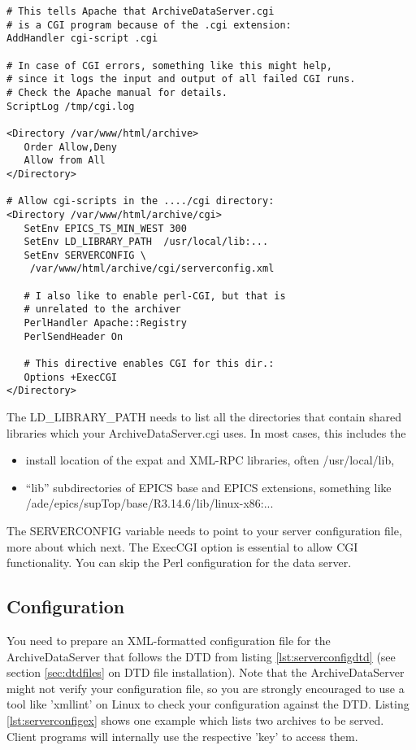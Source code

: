 \begin{enumerate}
\begin{lstlisting}[keywordstyle=\sffamily]
# This tells Apache that ArchiveDataServer.cgi
# is a CGI program because of the .cgi extension:
AddHandler cgi-script .cgi

# In case of CGI errors, something like this might help,
# since it logs the input and output of all failed CGI runs.
# Check the Apache manual for details.
ScriptLog /tmp/cgi.log

<Directory /var/www/html/archive>
   Order Allow,Deny
   Allow from All
</Directory>

# Allow cgi-scripts in the ..../cgi directory:
<Directory /var/www/html/archive/cgi>
   SetEnv EPICS_TS_MIN_WEST 300
   SetEnv LD_LIBRARY_PATH  /usr/local/lib:...
   SetEnv SERVERCONFIG \
    /var/www/html/archive/cgi/serverconfig.xml

   # I also like to enable perl-CGI, but that is
   # unrelated to the archiver
   PerlHandler Apache::Registry
   PerlSendHeader On

   # This directive enables CGI for this dir.:
   Options +ExecCGI
</Directory>
\end{lstlisting}
  The LD\_LIBRARY\_PATH needs to list all the directories that
  contain shared libraries which your ArchiveDataServer.cgi uses.
  In most cases, this includes the
  \begin{itemize}
  \item install location of the expat and XML-RPC
        libraries, often /usr/local/lib,
  \item ``lib'' subdirectories of EPICS base and EPICS extensions,
        something like /ade/epics/supTop/base/R3.14.6/lib/linux-x86:...
  \end{itemize}
  The SERVERCONFIG variable needs to point to your server configuration
  file, more about which next. The ExecCGI option is essential to
  allow CGI functionality. You can skip the Perl configuration for the
  data server.
\end{enumerate}

\subsection{Configuration}  %
You need to prepare an XML-formatted configuration file for the
ArchiveDataServer that follows the DTD from listing
\ref{lst:serverconfigdtd} (see section \ref{sec:dtdfiles} on DTD file
installation). Note that the ArchiveDataServer might not verify your
configuration file, so you are strongly encouraged to use a tool like
'xmllint' on Linux to check your configuration against the
DTD. Listing \ref{lst:serverconfigex} shows one example 
 which lists two archives to be served. Client
programs will internally use the respective 'key' to access them.

